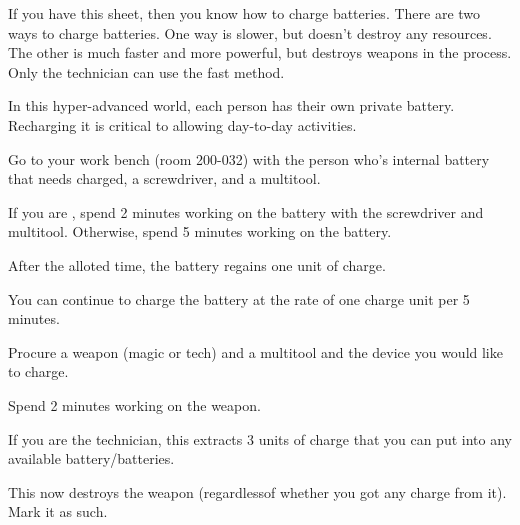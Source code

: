 \documentclass[green]{guildcamp3}
\begin{document}
\name{\gBatterycharge{}}



If you have this sheet, then you know how to charge batteries. There are two ways to charge batteries. One way is slower, but doesn't destroy any resources. The other is much faster and more powerful, but destroys weapons in the process. Only the technician can use the fast method. 

In this hyper-advanced world, each person has their own private battery. Recharging it is critical to allowing day-to-day activities. 


\begin{enum}
  \item Go to your work bench (room 200-032) with the person who's internal battery that needs charged, a screwdriver, and a multitool.
  \item If you are \cTech{}, spend 2 minutes working on the battery with the screwdriver and multitool. Otherwise, spend 5 minutes working on the battery.
  \item After the alloted time, the battery regains one unit of charge.
  \item You can continue to charge the battery at the rate of one charge unit per 5 minutes. 
\end{enum}

\begin{enum}
	\item Procure a weapon (magic or tech) and a multitool and the device you would like to charge.
	\item Spend 2 minutes working on the weapon. 
	\item If you are the technician, this extracts 3 units of charge that you can put into any available battery/batteries. 
	\item This now destroys the weapon (regardlessof whether you got any charge from it). Mark it as such. 
\end{enum}
\end{document}

